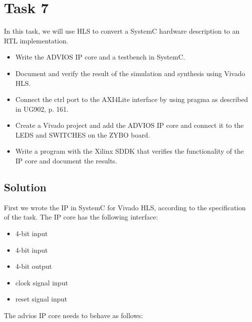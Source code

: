 \documentclass[../main.tex]{subfiles}
\begin{document}
\section{Task 7}

In this task, we will use HLS to convert a SystemC hardware description to an RTL implementation.

\begin{itemize}
    \item Write the ADVIOS IP core and a testbench in SystemC.
    \item Document and verify the result of the simulation and synthesis using Vivado HLS.
    \item Connect the ctrl port to the AXI4Lite interface by using pragma as described in UG902, p. 161.
    \item Create a Vivado project and add the ADVIOS IP core and connect it to the LEDS and SWITCHES on the ZYBO board.
    \item Write a program with the Xilinx SDDK that verifies the functionality of the IP core and document the results.
\end{itemize}

\subsection*{Solution}

First we wrote the IP in SystemC for Vivado HLS, according to the specification of the task. 
The IP core has the following interface:

\begin{itemize}
    \item {}     4-bit input
    \item {} 4-bit input
    \item {}  4-bit output
    \item {}      clock signal input
    \item {}    reset signal input
\end{itemize}

The advios IP core needs to behave as follows:
\end{document}
